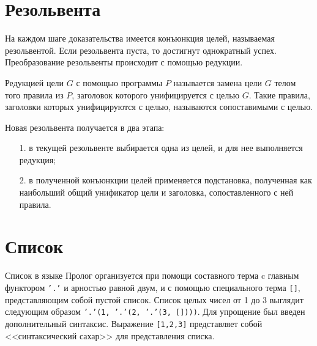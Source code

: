 \section{Резольвента}
На каждом шаге доказательства имеется конъюнкция целей, называемая резольвентой. Если резольвента пуста, то достигнут однократный успех. Преобразование резольвенты происходит с помощью редукции.

Редукцией цели \(G\) с помощью программы \(P\) называется замена цели \(G\) телом того правила из \(P\), заголовок которого унифицируется с целью \(G\). Такие правила, заголовки которых унифицируются с целью, называются сопоставимыми с целью.
 
Новая резольвента получается в два этапа:
\begin{itemize}
	\item [1.] в текущей резольвенте выбирается одна из целей, и для нее выполняется редукция;
	\item [2.] в полученной конъюнкции целей применяется подстановка, полученная как наибольший общий унификатор цели и заголовка, сопоставленного с ней правила.
\end{itemize}

\section{Список}
Список в языке Пролог организуется при помощи составного терма c главным функтором \texttt{'.'} и арностью равной двум, и с помощью специального терма \texttt{[]}, представляющим собой пустой список. Список целых чисел от 1 до 3 выглядит следующим образом \texttt{'.'(1, '.'(2, '.'(3, [])))}. Для упрощение был введен дополнительный синтаксис. Выражение \texttt{[1,2,3]} представляет собой <<синтаксический сахар>> для представления списка.